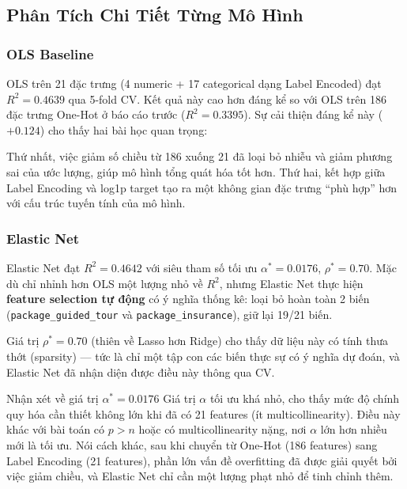 \documentclass[12pt,a4paper]{article}
\begin{document}
\subsection{Phân Tích Chi Tiết Từng Mô Hình}

\subsubsection{OLS Baseline}

OLS trên 21 đặc trưng (4 numeric + 17 categorical dạng Label Encoded) đạt $R^2 = 0.4639$ qua 5-fold CV. Kết quả này cao hơn đáng kể so với OLS trên 186 đặc trưng One-Hot ở báo cáo trước ($R^2 = 0.3395$). Sự cải thiện đáng kể này ($+0.124$) cho thấy hai bài học quan trọng:

Thứ nhất, việc giảm số chiều từ 186 xuống 21 đã loại bỏ nhiễu và giảm phương sai của ước lượng, giúp mô hình tổng quát hóa tốt hơn. Thứ hai, kết hợp giữa Label Encoding và log1p target tạo ra một không gian đặc trưng ``phù hợp'' hơn với cấu trúc tuyến tính của mô hình.

\subsubsection{Elastic Net}

Elastic Net đạt $R^2 = 0.4642$ với siêu tham số tối ưu $\alpha^* = 0.0176$, $\rho^* = 0.70$. Mặc dù chỉ nhỉnh hơn OLS một lượng nhỏ về $R^2$, nhưng Elastic Net thực hiện \textbf{feature selection tự động} có ý nghĩa thống kê: loại bỏ hoàn toàn 2 biến (\texttt{package\_guided\_tour} và \texttt{package\_insurance}), giữ lại 19/21 biến.

Giá trị $\rho^* = 0.70$ (thiên về Lasso hơn Ridge) cho thấy dữ liệu này có tính thưa thớt (sparsity) — tức là chỉ một tập con các biến thực sự có ý nghĩa dự đoán, và Elastic Net đã nhận diện được điều này thông qua CV.

\begin{remarkbox}{Nhận xét về giá trị $\alpha^* = 0.0176$}
Giá trị $\alpha$ tối ưu khá nhỏ, cho thấy mức độ chính quy hóa cần thiết không lớn khi đã có 21 features (ít multicollinearity). Điều này khác với bài toán có $p > n$ hoặc có multicollinearity nặng, nơi $\alpha$ lớn hơn nhiều mới là tối ưu. Nói cách khác, sau khi chuyển từ One-Hot (186 features) sang Label Encoding (21 features), phần lớn vấn đề overfitting đã được giải quyết bởi việc giảm chiều, và Elastic Net chỉ cần một lượng phạt nhỏ để tinh chỉnh thêm.
\end{remarkbox}
\end{document}
